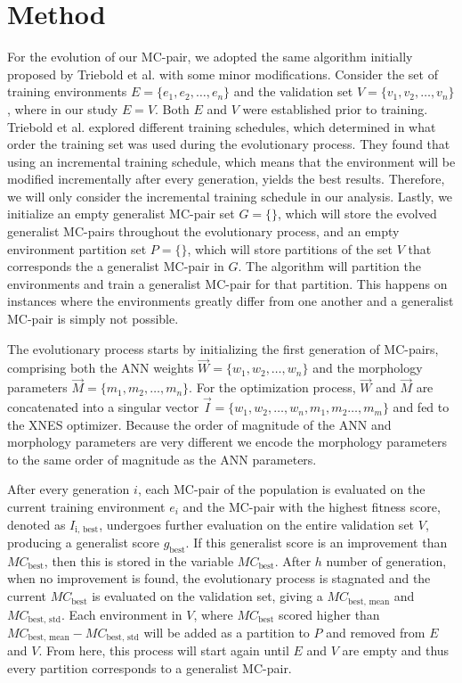 \section{Method}
    For the evolution of our MC-pair, we adopted the same algorithm initially proposed by Triebold et al. \cite{Corinna_Triebold} with some minor modifications. Consider the set of training environments $E = \{e_1, e_2, \ldots, e_n\}$ and the validation set $V = \{v_1, v_2, \ldots, v_n\}$, where in our study $E = V$. Both $E$ and $V$ were established prior to training. Triebold et al. explored different training schedules, which determined in what order the training set was used during the evolutionary process. They found that using an incremental training schedule, which means that the environment will be modified incrementally after every generation, yields the best results. Therefore, we will only consider the incremental training schedule in our analysis. Lastly, we initialize an empty generalist MC-pair set $G = \{\}$, which will store the evolved generalist MC-pairs throughout the evolutionary process, and an empty environment partition set $P = \{\}$, which will store partitions of the set $V$ that corresponds the a generalist MC-pair in $G$. The algorithm will partition the environments and train a generalist MC-pair for that partition. This happens on instances where the environments greatly differ from one another and a generalist MC-pair is simply not possible. 

    The evolutionary process starts by initializing the first generation of MC-pairs, comprising both the ANN weights $\overrightarrow{W} = \{w_1, w_2, \ldots, w_n\}$ and the morphology parameters $\overrightarrow{M} = \{m_1, m_2, \ldots, m_n\}$. For the optimization process, $\overrightarrow{W}$ and $\overrightarrow{M}$ are concatenated into a singular vector \newline $\overrightarrow{I} = \{w_1, w_2, \ldots, w_n, m_1, m_2 \ldots, m_m\}$ and fed to the XNES optimizer. Because the order of magnitude of the ANN and morphology parameters are very different we encode the morphology parameters to the same order of magnitude as the ANN parameters.

    After every generation $i$, each MC-pair of the population is evaluated on the current training environment $e_i$ and the MC-pair with the highest fitness score, denoted as $I_{\text{i, best}}$, undergoes further evaluation on the entire validation set $V$, producing a generalist score $g_{\text{best}}$. If this generalist score is an improvement than $MC_{\text{best}}$, then this is stored in the variable $MC_{\text{best}}$. After $h$ number of generation, when no improvement is found, the evolutionary process is stagnated and the current $MC_{\text{best}}$ is evaluated on the validation set, giving a $MC_{\text{best, mean}}$ and $MC_{\text{best, std}}$. Each environment in $V$, where $MC_{\text{best}}$ scored higher than $MC_{\text{best, mean}} - MC_{\text{best, std}}$ will be added as a partition to $P$ and removed from $E$ and $V$. From here, this process will start again until $E$ and $V$ are empty and thus every partition corresponds to a generalist MC-pair. 

